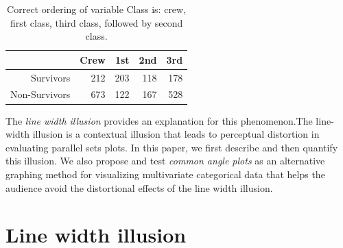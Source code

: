 \documentclass[journal]{vgtc}\usepackage{graphicx, color}
\begin{document}
\begin{table}
\begin{center}
\begin{tabular}{rrrrr}
& Crew & 1st & 2nd & 3rd \\ \hline
Survivors & 212 & 203 & 118 & 178\\
Non-Survivors & 673 & 122 & 167 &  528  
\end{tabular}
\caption{Correct ordering of variable Class is: crew, first class, third class, followed by second class. }
\end{center}
\end{table}
The \emph{line width illusion} provides an explanation for this phenomenon.The line-width illusion is a contextual illusion that leads to perceptual distortion in evaluating parallel sets plots. In this paper, we first describe and then quantify this illusion. We also propose and test \emph{common angle plots} as an alternative graphing method for visualizing multivariate categorical data that helps the audience avoid the distortional effects of the line width illusion.


%

\section{Line width illusion}
\end{document}
